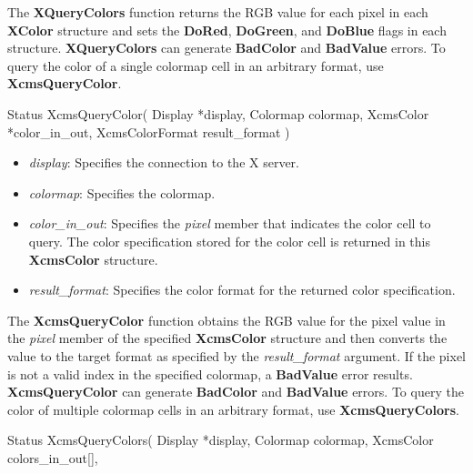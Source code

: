 \documentclass{report}
\begin{document}
\begin{itemize}
            The \textbf{XQueryColors} function returns the RGB value for each pixel in each \textbf{XColor} structure and sets the \textbf{DoRed}, \textbf{DoGreen}, and \textbf{DoBlue} flags in each structure.
            \bigbreak \noindent
            \textbf{XQueryColors} can generate \textbf{BadColor} and \textbf{BadValue} errors.
            \bigbreak \noindent
            To query the color of a single colormap cell in an arbitrary format, use \textbf{XcmsQueryColor}.
            \bigbreak \noindent
            \begin{cppcode}
                Status XcmsQueryColor(
                    Display *display,
                    Colormap colormap,
                    XcmsColor *color_in_out,
                    XcmsColorFormat result_format
                )
            \end{cppcode}
            \bigbreak \noindent
            \begin{itemize}
                \item \textit{display}: Specifies the connection to the X server.
                \item \textit{colormap}: Specifies the colormap.
                \item \textit{color\_in\_out}: Specifies the \textit{pixel} member that indicates the color cell to query. The color specification stored for the color cell is returned in this \textbf{XcmsColor} structure.
                \item \textit{result\_format}: Specifies the color format for the returned color specification.
            \end{itemize}
            \noindent
            The \textbf{XcmsQueryColor} function obtains the RGB value for the pixel value in the \textit{pixel} member of the specified \textbf{XcmsColor} structure and then converts the value to the target format as specified by the \textit{result\_format} argument. If the pixel is not a valid index in the specified colormap, a \textbf{BadValue} error results.
            \bigbreak \noindent
            \textbf{XcmsQueryColor} can generate \textbf{BadColor} and \textbf{BadValue} errors.
            \bigbreak \noindent
            To query the color of multiple colormap cells in an arbitrary format, use \textbf{XcmsQueryColors}.
            \bigbreak \noindent 
            \begin{cppcode}
                Status XcmsQueryColors(
                    Display *display,
                    Colormap colormap,
                    XcmsColor colors_in_out[],

\end{cppcode}
\end{itemize}
\end{document}
